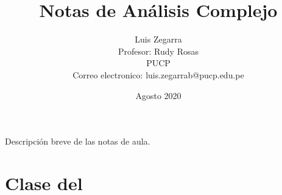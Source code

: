 \documentclass[11pt]{article}
\title{Notas de Análisis Complejo}
\author{Luis Zegarra \\ Profesor: Rudy Rosas \\ PUCP \\ Correo electronico: luis.zegarrab@pucp.edu.pe}
\date{Agosto 2020}
\begin{document}
 

\maketitle

Descripción breve de las notas de aula.

\tableofcontents

\newpage

\section{Clase del }


\end{document}
